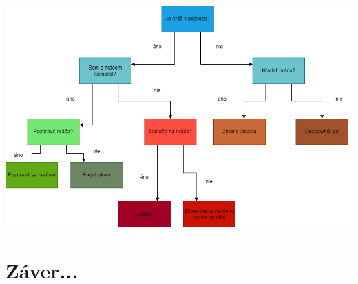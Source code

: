 \documentclass[10pt,twoside,slovak,a4paper]{article}
\begin{document}
\begin{center}

\hfill \break

\includegraphics[scale = 0.40]{MIP_NPC_latex.png}

\hfill \break

\end{center}

\section{Záver...}





\end{document}
